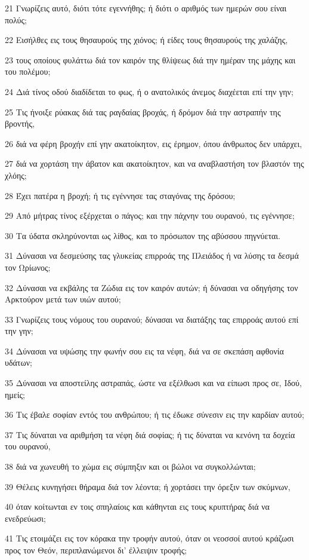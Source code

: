 \par 21 Γνωρίζεις αυτό, διότι τότε εγεννήθης; ή διότι ο αριθμός των ημερών σου είναι πολύς;
\par 22 Εισήλθες εις τους θησαυρούς της χιόνος; ή είδες τους θησαυρούς της χαλάζης,
\par 23 τους οποίους φυλάττω διά τον καιρόν της θλίψεως διά την ημέραν της μάχης και του πολέμου;
\par 24 Διά τίνος οδού διαδίδεται το φως, ή ο ανατολικός άνεμος διαχέεται επί την γην;
\par 25 Τις ήνοιξε ρύακας διά τας ραγδαίας βροχάς, ή δρόμον διά την αστραπήν της βροντής,
\par 26 διά να φέρη βροχήν επί γην ακατοίκητον, εις έρημον, όπου άνθρωπος δεν υπάρχει,
\par 27 διά να χορτάση την άβατον και ακατοίκητον, και να αναβλαστήση τον βλαστόν της χλόης;
\par 28 Έχει πατέρα η βροχή; ή τις εγέννησε τας σταγόνας της δρόσου;
\par 29 Από μήτρας τίνος εξέρχεται ο πάγος; και την πάχνην του ουρανού, τις εγέννησε;
\par 30 Τα ύδατα σκληρύνονται ως λίθος, και το πρόσωπον της αβύσσου πηγνύεται.
\par 31 Δύνασαι να δεσμεύσης τας γλυκείας επιρροάς της Πλειάδος ή να λύσης τα δεσμά τον Ωρίωνος;
\par 32 Δύνασαι να εκβάλης τα Ζώδια εις τον καιρόν αυτών; ή δύνασαι να οδηγήσης τον Αρκτούρον μετά των υιών αυτού;
\par 33 Γνωρίζεις τους νόμους του ουρανού; δύνασαι να διατάξης τας επιρροάς αυτού επί την γην;
\par 34 Δύνασαι να υψώσης την φωνήν σου εις τα νέφη, διά να σε σκεπάση αφθονία υδάτων;
\par 35 Δύνασαι να αποστείλης αστραπάς, ώστε να εξέλθωσι και να είπωσι προς σε, Ιδού, ημείς;
\par 36 Τις έβαλε σοφίαν εντός του ανθρώπου; ή τις έδωκε σύνεσιν εις την καρδίαν αυτού;
\par 37 Τις δύναται να αριθμήση τα νέφη διά σοφίας; ή τις δύναται να κενόνη τα δοχεία του ουρανού,
\par 38 διά να χωνευθή το χώμα εις σύμπηξιν και οι βώλοι να συγκολλώνται;
\par 39 Θέλεις κυνηγήσει θήραμα διά τον λέοντα; ή χορτάσει την όρεξιν των σκύμνων,
\par 40 όταν κοίτωνται εν τοις σπηλαίοις και κάθηνται εις τους κρυπτήρας διά να ενεδρεύωσι;
\par 41 Τις ετοιμάζει εις τον κόρακα την τροφήν αυτού, όταν οι νεοσσοί αυτού κράζωσι προς τον Θεόν, περιπλανώμενοι δι' έλλειψιν τροφής;

